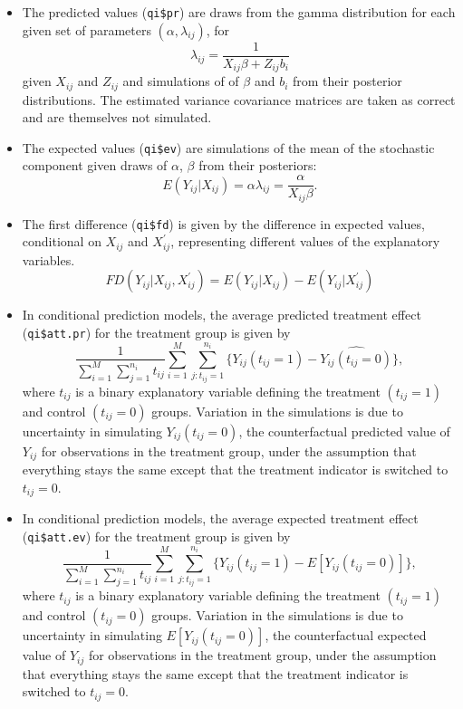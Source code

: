 \begin{itemize}
\item The predicted values ({\tt qi\$pr}) are draws from the gamma distribution for each given set of parameters $(\alpha, \lambda_{ij})$, for
\begin{equation*}
\lambda_{ij} = \frac{1}{X_{ij} \beta + Z_{ij} b_i}
\end{equation*}
given $X_{ij}$ and $Z_{ij}$ and simulations of of $\beta$ and $b_i$ from their posterior distributions. The estimated variance covariance matrices are taken as correct and are themselves not simulated.

\item The expected values ({\tt qi\$ev}) are simulations of the mean of the stochastic component given draws of $\alpha$, $\beta$ from their posteriors:
\begin{equation*}
E(Y_{ij} | X_{ij}) = \alpha \lambda_{ij} = \frac{\alpha}{X_{ij} \beta}.
\end{equation*}

\item The first difference ({\tt qi\$fd}) is given by the difference in expected values, conditional on $X_{ij}$ and $X_{ij}^\prime$, representing different values of the explanatory variables.
\begin{equation*}
FD(Y_{ij} | X_{ij}, X_{ij}^\prime) = E(Y_{ij} | X_{ij}) - E(Y_{ij} | X_{ij}^\prime)
\end{equation*}

\item In conditional prediction models, the average predicted treatment effect ({\tt qi\$att.pr}) for the treatment group is given by
\begin{equation*}
\frac{1}{\sum_{i = 1}^M \sum_{j = 1}^{n_i} t_{ij}} \sum_{i = 1}^M \sum_{j:t_{ij} = 1}^{n_i} \{ Y_{ij} (t_{ij} = 1) - \widehat{Y_{ij}(t_{ij} = 0)} \},
\end{equation*}
where $t_{ij}$ is a binary explanatory variable defining the treatment $(t_{ij} = 1)$ and control $(t_{ij} = 0)$ groups. Variation in the simulations is due to uncertainty in simulating $Y_{ij}(t_{ij} = 0)$, the counterfactual predicted value of $Y_{ij}$ for observations in the treatment group, under the assumption that everything stays the same except that the treatment indicator is switched to $t_{ij} = 0$.

\item In conditional prediction models, the average expected treatment effect ({\tt qi\$att.ev}) for the treatment group is given by
\begin{equation*}
\frac{1}{\sum_{i = 1}^M \sum_{j = 1}^{n_i} t_{ij}} \sum_{i = 1}^M \sum_{j:t_{ij} = 1}^{n_i} \{ Y_{ij} (t_{ij} = 1) - E[Y_{ij}(t_{ij} = 0)] \},
\end{equation*}
where $t_{ij}$ is a binary explanatory variable defining the treatment $(t_{ij} = 1)$ and control $(t_{ij} = 0)$ groups. Variation in the simulations is due to uncertainty in simulating $E[Y_{ij}(t_{ij} = 0)]$, the counterfactual expected value of $Y_{ij}$ for observations in the treatment group, under the assumption that everything stays the same except that the treatment indicator is switched to $t_{ij} = 0$.


\end{itemize}
